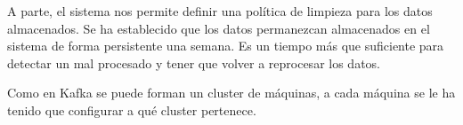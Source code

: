 A parte, el sistema nos permite definir una política de limpieza para los datos almacenados. Se ha establecido que los datos permanezcan almacenados en el sistema de forma persistente una semana. Es un tiempo más que suficiente para detectar un mal procesado y tener que volver a reprocesar los datos.

Como en Kafka se puede forman un cluster de máquinas, a cada máquina se le ha tenido que configurar a qué cluster pertenece.




